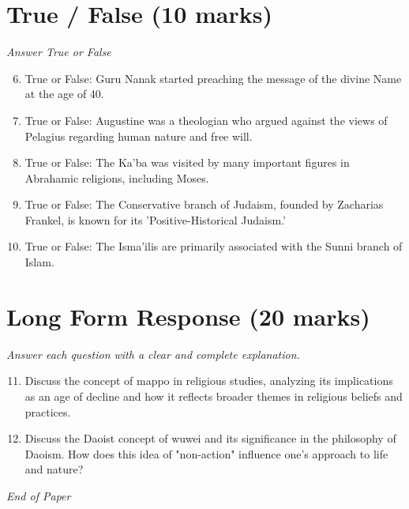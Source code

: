 \documentclass[12pt]{article}
\begin{document}
\section*{True / False (10 marks)}
\textit{Answer True or False}
\begin{enumerate}[label=\arabic*.]
\setcounter{enumi}{5}
\item True or False: Guru Nanak started preaching the message of the divine Name at the age of 40.
\item True or False: Augustine was a theologian who argued against the views of Pelagius regarding human nature and free will.
\item True or False: The Ka'ba was visited by many important figures in Abrahamic religions, including Moses.
\item True or False: The Conservative branch of Judaism, founded by Zacharias Frankel, is known for its 'Positive-Historical Judaism.'
\item True or False: The Isma'ilis are primarily associated with the Sunni branch of Islam.
\end{enumerate}

\section*{Long Form Response (20 marks)}
\textit{Answer each question with a clear and complete explanation.}
\begin{enumerate}[label=\arabic*.]
\setcounter{enumi}{10}
\item Discuss the concept of mappo in religious studies, analyzing its implications as an age of decline and how it reflects broader themes in religious beliefs and practices.
\item Discuss the Daoist concept of wuwei and its significance in the philosophy of Daoism. How does this idea of "non-action" influence one's approach to life and nature?
\end{enumerate}

\vfill
\noindent\textit{End of Paper}
\end{document}

